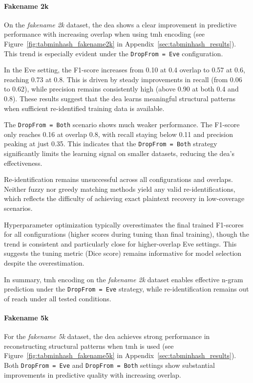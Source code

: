 \paragraph{Fakename 2k}

On the \textit{fakename 2k} dataset, the \ac{dea} shows a clear improvement in predictive performance with increasing overlap when using \ac{tmh} encoding (see Figure~\ref{fig:tabminhash_fakename2k} in Appendix~\ref{sec:tabminhash_results}).
This trend is especially evident under the \texttt{DropFrom = Eve} configuration.

In the Eve setting, the F1-score increases from 0.10 at 0.4 overlap to 0.57 at 0.6, reaching 0.73 at 0.8.
This is driven by steady improvements in recall (from 0.06 to 0.62), while precision remains consistently high (above 0.90 at both 0.4 and 0.8).
These results suggest that the \ac{dea} learns meaningful structural patterns when sufficient re-identified training data is available.

The \texttt{DropFrom = Both} scenario shows much weaker performance.
The F1-score only reaches 0.16 at overlap 0.8, with recall staying below 0.11 and precision peaking at just 0.35.
This indicates that the \texttt{DropFrom = Both} strategy significantly limits the learning signal on smaller datasets, reducing the \ac{dea}'s effectiveness.

Re-identification remains unsuccessful across all configurations and overlaps.
Neither fuzzy nor greedy matching methods yield any valid re-identifications, which reflects the difficulty of achieving exact plaintext recovery in low-coverage scenarios.

Hyperparameter optimization typically overestimates the final trained F1-scores for all configurations (higher scores during tuning than final training), though the trend is consistent and particularly close for higher-overlap Eve settings.
This suggests the tuning metric (Dice score) remains informative for model selection despite the overestimation.

In summary, \ac{tmh} encoding on the \textit{fakename 2k} dataset enables effective n-gram prediction under the \texttt{DropFrom = Eve} strategy, while re-identification remains out of reach under all tested conditions.


\paragraph{Fakename 5k}

For the \textit{fakename 5k} dataset, the \ac{dea} achieves strong performance in reconstructing structural patterns when \ac{tmh} is used (see Figure~\ref{fig:tabminhash_fakename5k} in Appendix~\ref{sec:tabminhash_results}).
Both \texttt{DropFrom = Eve} and \texttt{DropFrom = Both} settings show substantial improvements in predictive quality with increasing overlap.

